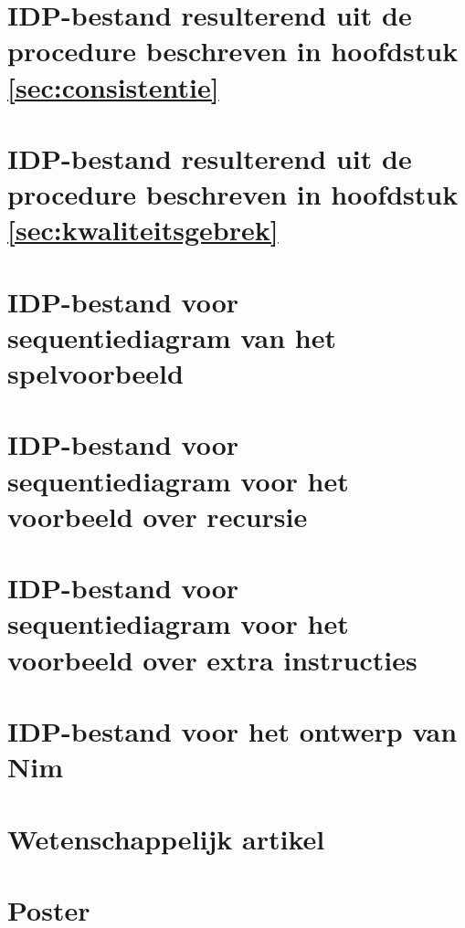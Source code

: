 \chapter{IDP-bestand resulterend uit de procedure beschreven in hoofdstuk \ref{sec:consistentie}}\label{app:consistentie}

\label{code:consistentie}

\chapter{IDP-bestand resulterend uit de procedure beschreven in hoofdstuk \ref{sec:kwaliteitsgebrek}}\label{app:kwaliteitsgebrek}

\label{code:kwaliteitsgebrek}

\chapter{IDP-bestand voor sequentiediagram van het spelvoorbeeld}\label{app:seq-diagram-game}

\label{code:seq-diagram-game}

\chapter{IDP-bestand voor sequentiediagram voor het voorbeeld over recursie}\label{app:seq-recursion}

\label{code:seq-recursion}

\chapter{IDP-bestand voor sequentiediagram voor het voorbeeld over extra instructies}\label{app:new-nim}

\label{code:new-nim}

\chapter{IDP-bestand voor het ontwerp van Nim}

\label{code:nim-eval}

\chapter{Wetenschappelijk artikel}


%

\chapter{Poster}

